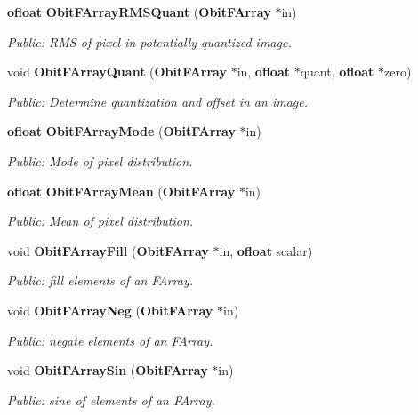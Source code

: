 \begin{CompactItemize}
{\bf ofloat} {\bf Obit\-FArray\-RMSQuant} ({\bf Obit\-FArray} $\ast$in)
\begin{CompactList}\small\item\em Public: RMS of pixel in potentially quantized image. \item\end{CompactList}\item 
void {\bf Obit\-FArray\-Quant} ({\bf Obit\-FArray} $\ast$in, {\bf ofloat} $\ast$quant, {\bf ofloat} $\ast$zero)
\begin{CompactList}\small\item\em Public: Determine quantization and offset in an image. \item\end{CompactList}\item 
{\bf ofloat} {\bf Obit\-FArray\-Mode} ({\bf Obit\-FArray} $\ast$in)
\begin{CompactList}\small\item\em Public: Mode of pixel distribution. \item\end{CompactList}\item 
{\bf ofloat} {\bf Obit\-FArray\-Mean} ({\bf Obit\-FArray} $\ast$in)
\begin{CompactList}\small\item\em Public: Mean of pixel distribution. \item\end{CompactList}\item 
void {\bf Obit\-FArray\-Fill} ({\bf Obit\-FArray} $\ast$in, {\bf ofloat} scalar)
\begin{CompactList}\small\item\em Public: fill elements of an FArray. \item\end{CompactList}\item 
void {\bf Obit\-FArray\-Neg} ({\bf Obit\-FArray} $\ast$in)
\begin{CompactList}\small\item\em Public: negate elements of an FArray. \item\end{CompactList}\item 
void {\bf Obit\-FArray\-Sin} ({\bf Obit\-FArray} $\ast$in)
\begin{CompactList}\small\item\em Public: sine of elements of an FArray. \item\end{CompactList}\item 

\end{CompactItemize}
